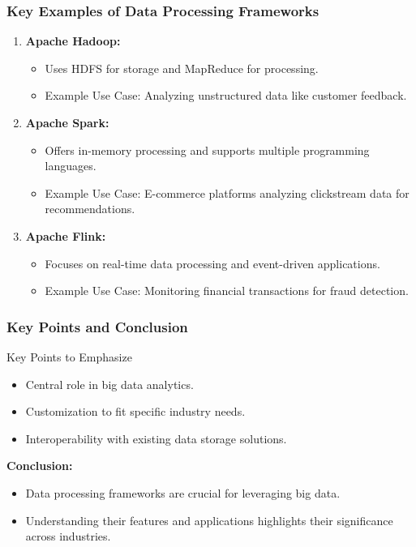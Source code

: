 \documentclass[aspectratio=169]{beamer}
\begin{document}
\begin{frame}[fragile]
    \frametitle{Key Examples of Data Processing Frameworks}

    \begin{enumerate}
        \item \textbf{Apache Hadoop:}
        \begin{itemize}
            \item Uses HDFS for storage and MapReduce for processing.
            \item Example Use Case: Analyzing unstructured data like customer feedback.
        \end{itemize}
        
        \item \textbf{Apache Spark:}
        \begin{itemize}
            \item Offers in-memory processing and supports multiple programming languages.
            \item Example Use Case: E-commerce platforms analyzing clickstream data for recommendations.
        \end{itemize}
        
        \item \textbf{Apache Flink:}
        \begin{itemize}
            \item Focuses on real-time data processing and event-driven applications.
            \item Example Use Case: Monitoring financial transactions for fraud detection.
        \end{itemize}
    \end{enumerate}
\end{frame}

\begin{frame}[fragile]
    \frametitle{Key Points and Conclusion}

    \begin{block}{Key Points to Emphasize}
        \begin{itemize}
            \item Central role in big data analytics.
            \item Customization to fit specific industry needs.
            \item Interoperability with existing data storage solutions.
        \end{itemize}
    \end{block}

    \textbf{Conclusion:}
    \begin{itemize}
        \item Data processing frameworks are crucial for leveraging big data.
        \item Understanding their features and applications highlights their significance across industries.
    \end{itemize}
\end{frame}
\end{document}
